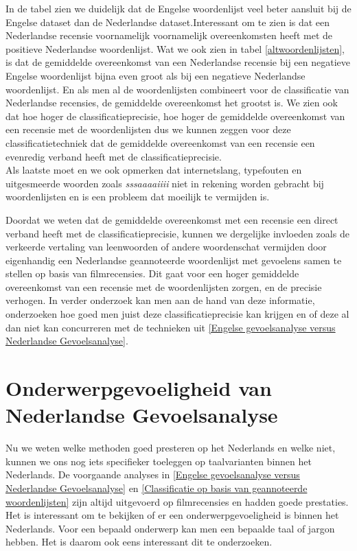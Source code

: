 In de tabel zien we duidelijk dat de Engelse woordenlijst veel beter aansluit bij de Engelse dataset dan de Nederlandse dataset.Interessant om te zien is dat een Nederlandse recensie voornamelijk voornamelijk overeenkomsten heeft met de positieve Nederlandse woordenlijst. Wat we ook zien in tabel \ref{altwoordenlijsten}, is dat de gemiddelde overeenkomst van een Nederlandse recensie bij een negatieve Engelse woordenlijst bijna even groot als bij een negatieve Nederlandse woordenlijst. En als men al de woordenlijsten combineert voor de classificatie van Nederlandse recensies, de gemiddelde overeenkomst het grootst is. We zien ook dat hoe hoger de classificatieprecisie, hoe hoger de gemiddelde overeenkomst van een recensie met de woordenlijsten dus we kunnen zeggen voor deze classificatietechniek dat de gemiddelde overeenkomst van een recensie een evenredig verband heeft met de classificatieprecisie.\\

Als laatste moet en we ook opmerken dat internetslang, typefouten en uitgesmeerde woorden zoals \textit{sssaaaaiiii} niet in rekening worden gebracht bij woordenlijsten en is een probleem dat moeilijk te vermijden is. 

Doordat we weten dat de gemiddelde overeenkomst met een recensie een direct verband heeft met de classificatieprecisie, kunnen we dergelijke invloeden zoals de verkeerde vertaling van leenwoorden of andere woordenschat vermijden door eigenhandig een Nederlandse geannoteerde woordenlijst met gevoelens samen te stellen op basis van filmrecensies. Dit gaat voor een hoger gemiddelde overeenkomst van een recensie met de woordenlijsten zorgen, en de precisie verhogen. In verder onderzoek kan men aan de hand van deze informatie, onderzoeken hoe goed men juist deze classificatieprecisie kan  krijgen en of deze al dan niet kan concurreren met de technieken uit \ref{Engelse gevoelsanalyse versus Nederlandse Gevoelsanalyse}.


\section{Onderwerpgevoeligheid van Nederlandse Gevoelsanalyse}\label{Onderwerpgevoeligheid van Nederlandse Gevoelsanalyse}

Nu we weten welke methoden goed presteren op het Nederlands en welke niet, kunnen we ons nog iets specifieker toeleggen op taalvarianten binnen het Nederlands. De voorgaande analyses in \ref{Engelse gevoelsanalyse versus Nederlandse Gevoelsanalyse} en \ref{Classificatie op basis van geannoteerde woordenlijsten} zijn altijd uitgevoerd op filmrecensies en hadden goede prestaties. Het is interessant om te bekijken of er een onderwerpgevoeligheid is binnen het Nederlands. Voor een bepaald onderwerp kan men een bepaalde taal of jargon hebben. Het is daarom ook eens interessant dit te onderzoeken. \\

